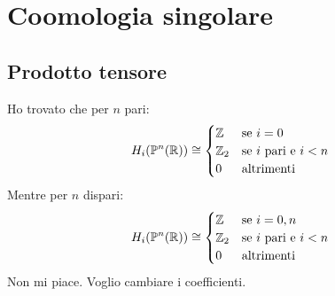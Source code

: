 \chapter{Coomologia singolare}


\section{Prodotto tensore}

Ho trovato che per $ n $ pari:
\[
  H_i(\mathbb{P}^{n} (\mathbb{R})) \cong
  \begin{cases}
    \mathbb{Z} & \text{se } i = 0 \\
    \mathbb{Z}_2 & \text{se $ i $ pari e $ i < n $} \\
    0 & \text{altrimenti}
  \end{cases}
\]
Mentre per $ n $ dispari:
\[
  H_i(\mathbb{P}^{n} (\mathbb{R})) \cong
  \begin{cases}
    \mathbb{Z} & \text{se } i = 0,n \\
    \mathbb{Z}_2 & \text{se $ i $ pari e $ i < n $} \\
    0 & \text{altrimenti}
  \end{cases}
\]
Non mi piace. Voglio cambiare i coefficienti.

